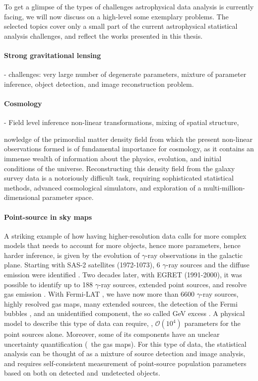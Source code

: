To get a glimpse of the types of challenges astrophysical data analysis is currently facing, we will now discuss on a high-level some exemplary problems. The selected topics cover only a small part of the current astrophysical statistical analysis challenges, and reflect the works presented in this thesis. %


\paragraph{Strong gravitational lensing}
 - challenges: very large number of degenerate parameters, mixture of parameter inference, object detection, and image reconstruction problem.
        


\paragraph{Cosmology}
    - Field level inference
     non-linear transformations, mixing of spatial structure,
     
     nowledge of the primordial matter density field from which the present non-linear observations formed is of fundamental importance for cosmology, as it contains an immense wealth of information about the physics, evolution, and initial conditions of the universe. Reconstructing this density field from the galaxy survey data is a notoriously difficult task, requiring sophisticated statistical methods, advanced cosmological simulators, and exploration of a multi-million-dimensional parameter space.
     

\paragraph{Point-source in sky maps} 
A striking example of how having higher-resolution data calls for more complex models that needs to account for more objects, hence more parameters, hence harder inference, is given by the evolution of $\gamma$-ray observations in the galactic plane. Starting with SAS-2 satellites (1972-1073), 6 $\gamma$-ray sources and the diffuse emission were identified \cite{Sas26ps, sas2}. Two decades later, with EGRET (1991-2000), it was possible to identify up to 188 $\gamma$-ray sources, extended point sources, and resolve gas emission \cite{Casandjian:2008ky}. With Fermi-LAT \cite{Fermi-LAT:2022byn}, we have now more than 6600  $\gamma$-ray sources, highly resolved gas maps, many extended sources, the detection of the Fermi bubbles \cite{dobler2010fermi}, and an unidentified component, the so called GeV excess \cite{Goodenough:2009gk}. A physical model to describe this type of data can require, \eg, $\mathcal{O}(10^4)$ parameters for the point sources alone. Moreover, some of its components have an unclear uncertainty quantification (\eg\ the gas maps). For this type of data, the statistical analysis can be thought of as a mixture of source detection and image analysis, and requires self-consistent measurement of point-source population parameters based on both on detected and undetected objects.
          
